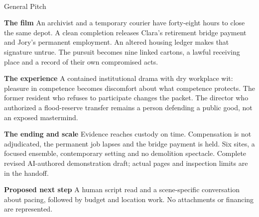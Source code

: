 \documentclass[11pt,letterpaper]{article}
\begin{document}
\begin{center}
{\Large\bfseries\sffamily \filmtitleupper}\\[6pt]
General Pitch
\end{center}
\textbf{The film} An archivist and a temporary courier have forty-eight hours to close the same depot. A clean completion releases Clara's retirement bridge payment and Jory's permanent employment. An altered housing ledger makes that signature untrue. The pursuit becomes nine linked cartons, a lawful receiving place and a record of their own compromised acts.

\textbf{The experience} A contained institutional drama with dry workplace wit: pleasure in competence becomes discomfort about what competence protects. The former resident who refuses to participate changes the packet. The director who authorized a flood-reserve transfer remains a person defending a public good, not an exposed mastermind.

\textbf{The ending and scale} Evidence reaches custody on time. Compensation is not adjudicated, the permanent job lapses and the bridge payment is held. Six sites, a focused ensemble, contemporary setting and no demolition spectacle. Complete revised AI-authored demonstration draft; actual pages and inspection limits are in the handoff.

\textbf{Proposed next step} A human script read and a scene-specific conversation about pacing, followed by budget and location work. No attachments or financing are represented.
\end{document}
